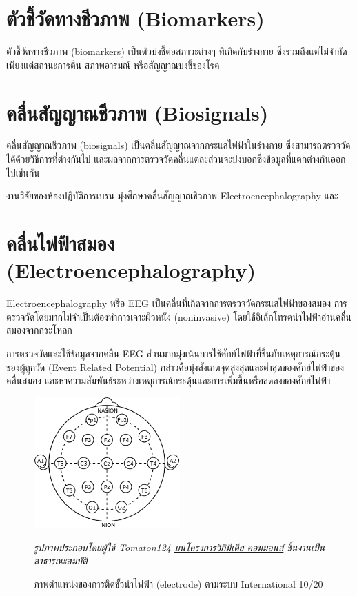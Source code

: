 \section{ตัวชี้วัดทางชีวภาพ (Biomarkers)}
ตัวชี้วัดทางชีวภาพ (biomarkers) เป็นตัวบ่งชี้ต่อสภาวะต่างๆ ที่เกิดกับร่างกาย ซึ่งรวมถึงแต่ไม่จำกัดเพียงแต่สถานะการตื่น สภาพอารมณ์
หรือสัญญาณบ่งชี้ของโรค

\section{คลื่นสัญญาณชีวภาพ (Biosignals)}
คลื่นสัญญาณชีวภาพ (biosignals) เป็นคลื่นสัญญาณจากกระแสไฟฟ้าในร่างกาย ซึ่งสามารถตรวจวัดได้ด้วยวิธีการที่ต่างกันไป
และผลจากการตรวจวัดคลื่นแต่ละส่วนจะบ่งบอกซึ่งข้อมูลที่แตกต่างกันออกไปเช่นกัน

งานวิจัยของห้องปฏิบัติการเบรน มุ่งศึกษาคลื่นสัญญาณชีวภาพ Electroencephalography และ

\section{คลื่นไฟฟ้าสมอง (Electroencephalography)}
Electroencephalography หรือ EEG เป็นคลื่นที่เกิดจากการตรวจวัดกระแสไฟฟ้าของสมอง การตรวจวัดโดยมากไม่จำเป็นต้องทำการเจาะผิวหนัง
(noninvasive) โดยใช้อิเล็กโทรดนำไฟฟ้าอ่านคลื่นสมองจากกระโหลก

การตรวจวัดและใช้ข้อมูลจากคลื่น EEG ส่วนมากมุ่งเน้นการใช้ศักย์ไฟฟ้าที่ขึ้นกับเหตุการณ์กระตุ้นของผู้ถูกวัด
(Event Related Potential) กล่าวคือมุ่งสังเกตจุดสูงสุดและต่ำสุดของศักย์ไฟฟ้าของคลื่นสมอง
และหาความสัมพันธ์ระหว่างเหตุการณ์กระตุ้นและการเพิ่มขึ้นหรือลดลงของศักย์ไฟฟ้า

\begin{figure}[h]
	\centering
	\includegraphics[width=0.5\textwidth]{images/1020.png}
	\caption{ภาพตำแหน่งของการติดขั้วนำไฟฟ้า (electrode) ตามระบบ International 10/20}
	\hspace{\linewidth}
	\textit{รูปภาพประกอบโดยผู้ใช้ Tomaton124 \href{https://commons.wikimedia.org/wiki/File:21_electrodes_of_International_10-20_system_for_EEG.svg}{บนโครงการวิกิมีเดีย คอมมอนส์}
		ชิ้นงานเป็นสาธารณะสมบัติ}
\end{figure}

